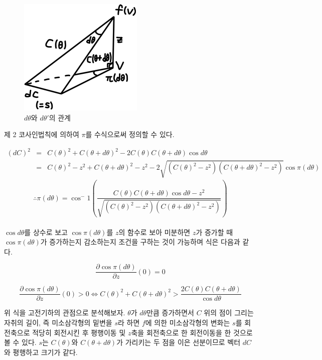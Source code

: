 \documentclass[11pt]{article}
\begin{document}
\begin{figure}
\centering
\includegraphics{6.png}
\caption{$d\theta$와 $d\theta'$의 관계}
\end{figure}


제 2 코사인법칙에 의하여 $\pi$를 수식으로써 정의할 수 있다.


\begin{eqnarray}
(dC)^2 & =& C(\theta)^2+C(\theta+d\theta)^2-2C(\theta)C(\theta+d\theta)\cos d\theta \nonumber
\\& =& C(\theta)^2 -z^2 +C(\theta+d\theta)^2 -z^2
-2\sqrt{(C(\theta)^2 -z^2)(C(\theta+d\theta)^2 -z^2)}\cos \pi (d \theta) \nonumber
\end{eqnarray}
\begin{equation}
\therefore \pi(d\theta)= \cos^-1 \left( \frac{C(\theta)C(\theta+d\theta)\cos d\theta -z^2}{\sqrt{(C(\theta)^2 -z^2)(C(\theta+d\theta)^2 -z^2)}} \right)
\end{equation}
\\

$\cos d\theta$를 상수로 보고 $\cos \pi(d\theta)$를 $z$의 함수로 보아 미분하면 $z$가 증가할 때 $\cos \pi (d\theta)$가 증가하는지 감소하는지 조건을 구하는 것이 가능하며 식은 다음과 같다.


\begin{equation}
\frac{\partial \cos\pi(d \theta)}{\partial z}(0)=0 \nonumber
\end{equation}

\begin{equation}
\frac{\partial \cos\pi(d \theta)}{\partial z}(0)>0 \iff 
C(\theta)^2 + C(\theta+d\theta)^2 > \frac{2C(\theta)C(\theta+d\theta)}{\cos d\theta} \nonumber
\end{equation}



위 식을 고전기하의 관점으로 분석해보자. $\theta$가 $d\theta$만큼 증가하면서 $C$ 위의 점이 그리는 자취의 길이, 즉 미소삼각형의 밑변을 $s$라 하면 $f$에 의한 미소삼각형의 변화는 $s$를 회전축으로 적당히 회전시킨 후 평행이동 및 $z$축을 회전축으로 한 회전이동을 한 것으로 볼 수 있다. $s$는 $C(\theta)$와 $C(\theta+d \theta)$가 가리키는 두 점을 이은 선분이므로 벡터 $dC$와 평행하고 크기가 같다.
\end{document}
